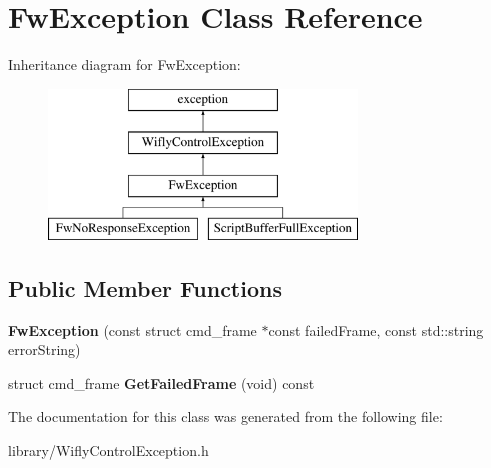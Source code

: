 \hypertarget{class_fw_exception}{\section{Fw\-Exception Class Reference}
\label{class_fw_exception}
}
Inheritance diagram for Fw\-Exception\-:\begin{figure}[H]
\begin{center}
\leavevmode
\includegraphics[height=4.000000cm]{class_fw_exception}
\end{center}
\end{figure}
\subsection*{Public Member Functions}
\begin{DoxyCompactItemize}
\item 
\hypertarget{class_fw_exception_a2ed0f0fded36da55c6ab89e84f690941}{{\bfseries Fw\-Exception} (const struct cmd\-\_\-frame $\ast$const failed\-Frame, const std\-::string error\-String)}\label{class_fw_exception_a2ed0f0fded36da55c6ab89e84f690941}

\item 
\hypertarget{class_fw_exception_af8b9d2e412bd11f40cc8b3964d6da13a}{struct cmd\-\_\-frame {\bfseries Get\-Failed\-Frame} (void) const }\label{class_fw_exception_af8b9d2e412bd11f40cc8b3964d6da13a}

\end{DoxyCompactItemize}


The documentation for this class was generated from the following file\-:\begin{DoxyCompactItemize}
\item 
library/Wifly\-Control\-Exception.\-h\end{DoxyCompactItemize}
